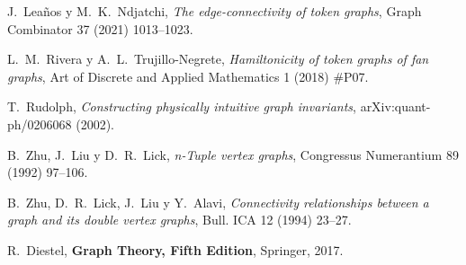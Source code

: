 \begin{thebibliography}{99}
  J.~Lea\~{n}os y M.~K.~Ndjatchi,
  \textit{The edge-connectivity of token graphs},
  Graph Combinator 37 (2021) 1013--1023. 
 
  L.~M.~Rivera y A.~L.~Trujillo-Negrete,
  \textit{Hamiltonicity of token graphs of fan graphs},
  Art of Discrete and Applied Mathematics 1 (2018) \#P07. 

T.~Rudolph,
 \textit{Constructing physically intuitive graph invariants},
 arXiv:quant-ph/0206068 (2002).

  B.~Zhu, J.~Liu y D.~R.~Lick,
 \textit{n-Tuple vertex graphs},
 Congressus Numerantium 89 (1992) 97--106.

  B.~Zhu, D.~R.~Lick, J.~Liu y Y.~Alavi,
 \textit{Connectivity relationships between a graph and
 its double vertex graphs},
 Bull. ICA 12 (1994) 23--27.


  R.~Diestel,
  \textbf{Graph Theory, Fifth Edition},
  Springer, 2017.

\end{thebibliography}

